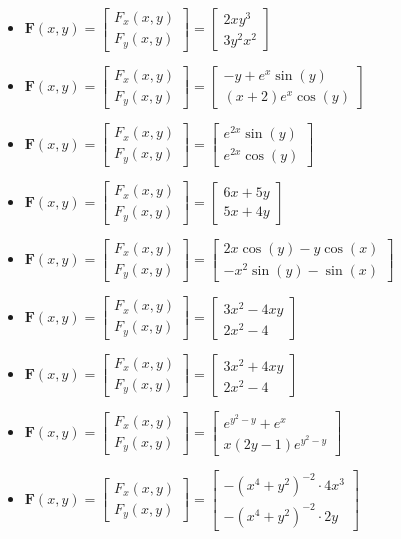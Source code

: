 \documentclass{article}
\newcommand{\colxyvec}[2]{\begin{bmatrix} #1 \\ #2 \end{bmatrix}}
\begin{document}
 \begin{itemize}
\item \(\mathbf{F}(x,y) = \colxyvec{F_x(x,y)}{F_y(x,y)} = \colxyvec{2xy^3}{3y^2x^2}\) 
\item \(\mathbf{F}(x,y) = \colxyvec{F_x(x,y)}{F_y(x,y)} = \colxyvec{-y + e^x\sin(y)}{(x + 2)e^x\cos(y)}\) 
\item \(\mathbf{F}(x,y) = \colxyvec{F_x(x,y)}{F_y(x,y)} = \colxyvec{e^{2x}\sin(y)}{e^{2x}\cos(y)}\) 
\item \(\mathbf{F}(x,y) = \colxyvec{F_x(x,y)}{F_y(x,y)} = \colxyvec{6x + 5y}{5x + 4y}\) 
\item \(\mathbf{F}(x,y) = \colxyvec{F_x(x,y)}{F_y(x,y)} = \colxyvec{2x\cos(y) - y\cos(x)}{-x^2\sin(y) - \sin(x)}\) 
\item \(\mathbf{F}(x,y) = \colxyvec{F_x(x,y)}{F_y(x,y)} = \colxyvec{3x^2 - 4xy}{2x^2 - 4}\)
\item \(\mathbf{F}(x,y) = \colxyvec{F_x(x,y)}{F_y(x,y)} = \colxyvec{3x^2 + 4xy}{2x^2 - 4}\)
\item \(\mathbf{F}(x,y) = \colxyvec{F_x(x,y)}{F_y(x,y)} = \colxyvec{e^{y^2 - y} + e^x}{x(2y - 1)e^{y^2 - y}}\)
\item \(\mathbf{F}(x,y) = \colxyvec{F_x(x,y)}{F_y(x,y)} = \colxyvec{-(x^4 + y^2)^{-2} \cdot 4x^3}{-(x^4 + y^2)^{-2} \cdot 2y}\)
\end{itemize}
\end{document}
